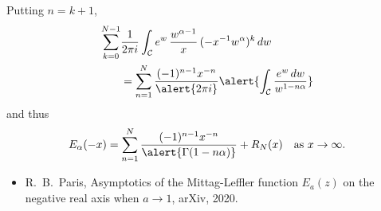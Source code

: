 \documentclass{beamer}
\begin{document}
\begin{frame}
Putting $n=k+1$,
\begin{align*}
\sum_{k=0}^{N-1}&\frac{1}{2\pi i}\int_{\mathcal{C}}
    e^w\,\frac{w^{\alpha-1}}{x}\,(-x^{-1}w^\alpha)^k\,dw\\
    &=\sum_{n=1}^N\frac{(-1)^{n-1}x^{-n}}{\alert{2\pi i}} 
    \alert{\int_{\mathcal{C}}\frac{e^w\,dw}{w^{1-n\alpha}}}
\end{align*}    
and thus
\[
E_\alpha(-x)=\sum_{n=1}^N\frac{(-1)^{n-1}x^{-n}}{\alert{\Gamma(1-n\alpha)}}
    +R_N(x)\quad\text{as $x\to\infty$.}
\]
\vfill
\begin{itemize}
\item R.~B.~Paris, Asymptotics of the Mittag-Leffler function $E_a(z)$
on the negative real axis when $a\to1$, arXiv, 2020.
\end{itemize}
\end{frame}
\end{document}
